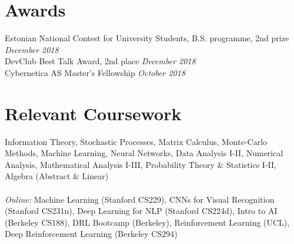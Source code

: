 \documentclass[margin,line]{res}
\begin{document}
\begin{resume}
\section{\sc Awards}
Estonian National Contest for University Students, B.S. programme, 2nd prize \hfill {\it December 2018}\vspace*{+.05in}\\
DevClub Best Talk Award, 2nd place \hfill {\it December 2018}\vspace*{+.05in}\\
Cybernetica AS  Master's Fellowship \hfill {\it October 2018}


\section{\sc Relevant Coursework}
Information Theory, Stochastic Processes, Matrix Calculus, Monte-Carlo Methods, Machine Learning, Neural Networks, Data Analysis I-II, Numerical Analysis, Mathematical Analysis I-III, Probability Theory \& Statistics I-II, Algebra (Abstract \& Linear)
\vspace*{-.1in}
\\\\
{\it Online:} Machine Learning (Stanford CS229), CNNs for Visual Recognition (Stanford CS231n), Deep Learning for NLP (Stanford CS224d),
Intro to AI (Berkeley CS188), DRL Bootcamp (Berkeley), Reinforcement Learning (UCL), Deep Reinforcement Learning (Berkeley CS294)


\end{resume}
\end{document}
